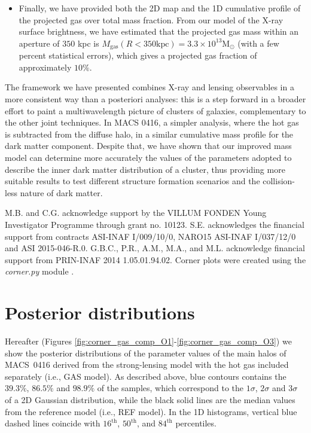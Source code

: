 \documentclass[twocolumn]{aastex61}
\begin{document}
\begin{itemize}
from $\approx 70$ kpc out to more than $350$ kpc from the northern BCG.
This demonstrates the importance of modeling separately and
disentangling the hot gas component to measure more accurately the dark matter
distribution in galaxy clusters.
\item Finally, we have provided both the 2D map and the 1D cumulative profile of
the projected gas over total mass fraction.
From our model of the X-ray surface brightness, we have estimated that the projected
gas mass within an aperture of $350$ kpc is $M_\text{gas}(R<350\text{kpc}) = 3.3 \times 10^{13} $M$_\odot$
(with a few percent statistical errors), which gives a projected gas fraction of
approximately $10\%$.
\end{itemize}

The framework we have
presented combines X-ray and lensing observables in a more consistent way than
a posteriori analyses: this is a step forward in a broader effort to paint a
multiwavelength picture of clusters of galaxies, complementary to the other
joint techniques.
In MACS 0416, a simpler analysis, where the hot gas is subtracted from the diffuse
halo,  in a similar cumulative mass profile for the
dark matter component.
Despite that, we have shown that our improved mass model can determine more
accurately the values of the parameters adopted to describe the inner
dark matter distribution of a cluster, thus providing more suitable
results to test different structure formation scenarios and the collision-less
nature of dark matter.



\acknowledgments
M.B. and C.G. acknowledge support by the VILLUM FONDEN Young Investigator Programme
through grant no. 10123.
S.E. acknowledges the financial support from contracts ASI-INAF I/009/10/0,
NARO15 ASI-INAF I/037/12/0 and ASI 2015-046-R.0.
G.B.C., P.R., A.M., M.A., and M.L. acknowledge financial support from PRIN-INAF
2014 1.05.01.94.02.
Corner plots were created using the \emph{corner.py} module \citep{Foreman2016}.



\appendix

\section{Posterior distributions}
\label{sec:posteriors}
Hereafter (Figures \ref{fig:corner_gas_comp_O1}-\ref{fig:corner_gas_comp_O3}) we
show the posterior distributions of the parameter values of the main halos of MACS~0416
derived from the strong-lensing model with the hot gas included separately (i.e., GAS model).
As described above, blue contours contains the  $39.3\%$,  $86.5\%$ and $98.9\%$ of the
samples, which correspond to  the $1\sigma$, $2\sigma$ and $3\sigma$ of a 2D Gaussian
distribution, while the black solid lines are the median values from the
reference model (i.e., REF model).
In the 1D histograms, vertical blue dashed lines coincide with $16^\text{th}$, $50^\text{th}$,
and $84^\text{th}$ percentiles.
\end{document}
